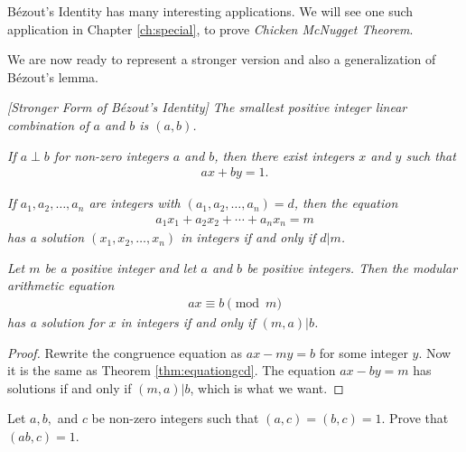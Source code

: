 \documentclass{subfile}
\begin{document}
	B\'{e}zout's Identity has many interesting applications. We will see one such application in Chapter \ref{ch:special}, to prove \textit{Chicken McNugget Theorem}. 
	
	We are now ready to represent a stronger version and also a generalization of B\'{e}zout's lemma.
	
	\begin{corollary} \slshape  [Stronger Form of B\'{e}zout's Identity]\label{cor:strongbezout}
		The smallest positive integer linear combination of $a$ and $b$ is $(a,b)$.
	\end{corollary}
	
	\begin{corollary} \slshape \label{cor:bezoutcoprime}
		If $a \perp b$ for non-zero integers $a$ and $b$, then there exist integers $x$ and $y$ such that
		\begin{align*}
		ax+by=1.
		\end{align*}
	\end{corollary}
	
	\begin{theorem}  \slshape 
		If $a_1, a_2, \ldots, a_n$ are integers with $(a_1, a_2, \ldots, a_n)=d$, then the equation
		\begin{align*}
		a_1x_1 + a_2x_2 + \cdots + a_n x_n = m
		\end{align*}
		has a solution $(x_1, x_2, \ldots, x_n)$ in integers if and only if $d|m$.
	\end{theorem}
	
	\begin{theorem}\slshape\label{thm:ax=b}
		Let $m$ be a positive integer and let $a$ and $b$ be positive integers. Then the modular arithmetic equation
		\begin{align*} ax \equiv b \pmod m\end{align*}
		has a solution for $x$ in integers if and only if $(m,a)|b$.
	\end{theorem}
	
	\begin{proof}
		Rewrite the congruence equation as $ax-my = b$ for some integer $y$. Now it is the same as Theorem \ref{thm:equationgcd}. The equation $ax-by=m$ has solutions if and only if $(m,a)|b$, which is what we want.
	\end{proof}
	
	\begin{problem}
		Let $a,b,$ and $c$ be non-zero integers such that $(a, c)=(b,c)=1$. Prove that $(ab,c)=1$.
	\end{problem}
	
\end{document}
